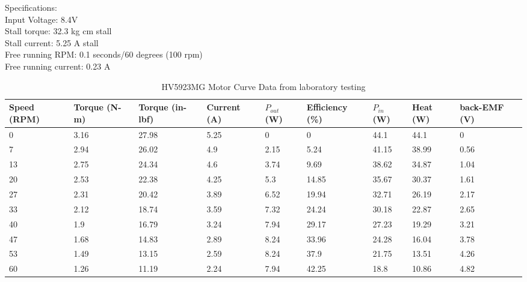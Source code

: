\noindent
Specifications:\\
\noindent
\indent Input Voltage: 8.4V \\
\indent Stall torque: 32.3 kg cm stall \\
\indent Stall current: 5.25 A stall \\
\indent Free running RPM: 0.1 seconds/60 degrees (100 rpm) \\
\indent Free running current: 0.23 A \\





\begin{table} [H]
	\centering
	\caption{HV5923MG Motor Curve Data from laboratory testing}
	\label{tab:MotorData}
	\begin{tabular}{|p{1cm}|p{1.2cm}|p{1.4cm}|p{1cm}|p{1cm}|p{1.5cm}|p{1cm}|p{1cm}|p{1.1cm}|}
		\hline
		Speed (RPM) & Torque (N-m) & Torque (in-lbf) & Current (A) & $P_{out}$ (W) & Efficiency (\%) & $P_{in}$ (W) & Heat (W) & back-EMF (V) \\
		\hline
		
		0 & 3.16 & 27.98 & 5.25 & 0 & 0 & 44.1 & 44.1 & 0 \\
		
		7 & 2.94 & 26.02 & 4.9 & 2.15 & 5.24 & 41.15 & 38.99 & 0.56 \\
		
		13 & 2.75 & 24.34 & 4.6 & 3.74 & 9.69 & 38.62 & 34.87 & 1.04 \\
		
		20 & 2.53 & 22.38 & 4.25 & 5.3 & 14.85 & 35.67 & 30.37 & 1.61 \\
		
		27 & 2.31 & 20.42 & 3.89 & 6.52 & 19.94 & 32.71 & 26.19 & 2.17 \\
		
		33 & 2.12 & 18.74 & 3.59 & 7.32 & 24.24 & 30.18 & 22.87 & 2.65 \\
		
		40 & 1.9 & 16.79 & 3.24 & 7.94 & 29.17 & 27.23 & 19.29 & 3.21 \\
		
		47 & 1.68 & 14.83 & 2.89 & 8.24 & 33.96 & 24.28 & 16.04 & 3.78 \\
		
		53 & 1.49 & 13.15 & 2.59 & 8.24 & 37.9 & 21.75 & 13.51 & 4.26 \\
		
		60 & 1.26 & 11.19 & 2.24 & 7.94 & 42.25 & 18.8 & 10.86 & 4.82 \\
		

\end{tabular}
\end{table}
